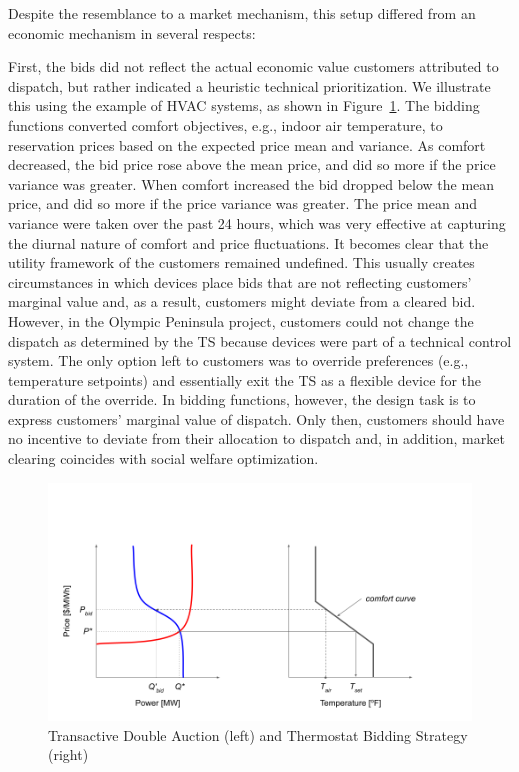Despite the resemblance to a market mechanism, this setup differed from an economic mechanism in several respects:

First, the bids did not reflect the actual economic value customers attributed to dispatch, but rather indicated a heuristic technical prioritization. 
We illustrate this using the example of HVAC systems, as shown in  Figure~\ref{fig:Transactive_DA}.
The bidding functions converted comfort objectives, e.g., indoor air temperature, to reservation prices based on the expected price mean and variance. As comfort decreased, the bid price rose above the mean price, and did so more if the price variance was greater. When comfort increased the bid dropped below the mean price, and did so more if the price variance was greater. The price mean and variance were taken over the past 24 hours, which was very effective at capturing the diurnal nature of comfort and price fluctuations.
It becomes clear that the utility framework of the customers remained undefined. This usually creates circumstances in which devices place bids that are not reflecting customers' marginal value and, as a result, customers might deviate from a cleared bid. However, in the Olympic Peninsula project, customers could not change the dispatch as determined by the TS because devices were part of a technical control system. The only option left to customers was to override preferences (e.g., temperature setpoints) and essentially exit the TS as a flexible device for the duration of the override. In bidding functions, however, the design task is to express customers' marginal value of dispatch. Only then, customers should have no incentive to deviate from their allocation to dispatch and, in addition, market clearing coincides with social welfare optimization. 

\begin{figure}[t]
\centering
\includegraphics[scale=0.5]{images/TE_DA.png}
\caption{Transactive Double Auction (left) and Thermostat Bidding Strategy (right)}
\label{fig:Transactive_DA}
\end{figure}

